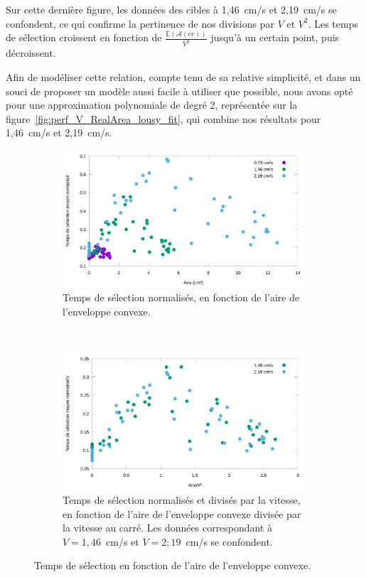 	Sur cette dernière figure, les données des cibles à 1,46~cm/s et 2,19~cm/s se confondent, ce qui confirme la pertinence de nos divisions par $V$ et $V^{2}$. Les temps de sélection croissent en fonction de $\frac{\mathbb{E}(\mathcal{A}(ec))}{V^{2}}$ jusqu'à un certain point, puis décroissent.
	
	Afin de modéliser cette relation, compte tenu de sa relative simplicité, et dans un souci de proposer un modèle aussi facile à utiliser que possible, nous avons opté pour une approximation polynomiale de degré 2, représentée sur la figure~\ref{fig:perf_V_RealArea_lousy_fit}, qui combine nos résultats pour 1,46~cm/s et 2,19~cm/s.


	\begin{figure}[!htb]
		\begin{subfigure}[t]{0.485\textwidth}
			\centering
			\includegraphics[width=\textwidth]{figures/ch4/perf_V_RealArea_raw}
			\caption{Temps de sélection normalisés, en fonction de l'aire de l'enveloppe convexe.}
			\label{fig:perf_V_RealArea_raw}
		\end{subfigure}
		~
		\begin{subfigure}[t]{0.485\textwidth}
			\centering
			\includegraphics[width=\textwidth]{figures/ch4/perf_V_RealArea_normed}
			\caption{Temps de sélection normalisés et divisés par la vitesse, en fonction de l'aire de l'enveloppe convexe divisée par la vitesse au carré. Les données correspondant à $V = 1,46$~cm/s et $V = 2;19$~cm/s se confondent.}
			\label{fig:perf_V_RealArea_normed}
		\end{subfigure}
		\caption[MTSN en fonction de l'aire]{Temps de sélection en fonction de l'aire de l'enveloppe convexe.}
		\label{fig:perf_V_RealArea_raw_and_normed}
	\end{figure}


